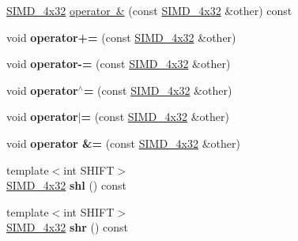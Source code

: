 \begin{DoxyCompactItemize}
\item 
\mbox{\hyperlink{class_botan_1_1_s_i_m_d__4x32}{S\+I\+M\+D\+\_\+4x32}} \mbox{\hyperlink{class_botan_1_1_s_i_m_d__4x32_ac6a07777190e0fdb9fb9147e63d8e57a}{operator \&}} (const \mbox{\hyperlink{class_botan_1_1_s_i_m_d__4x32}{S\+I\+M\+D\+\_\+4x32}} \&other) const
\item 
\mbox{\label{class_botan_1_1_s_i_m_d__4x32_a18258301e5b545b1f1829e6f41fd2c85}} 
void {\bfseries operator+=} (const \mbox{\hyperlink{class_botan_1_1_s_i_m_d__4x32}{S\+I\+M\+D\+\_\+4x32}} \&other)
\item 
\mbox{\label{class_botan_1_1_s_i_m_d__4x32_a14d988ef463a57146ca69b76b26ea7a2}} 
void {\bfseries operator-\/=} (const \mbox{\hyperlink{class_botan_1_1_s_i_m_d__4x32}{S\+I\+M\+D\+\_\+4x32}} \&other)
\item 
\mbox{\label{class_botan_1_1_s_i_m_d__4x32_af2530b46ff199ece1058295a9bb78b74}} 
void {\bfseries operator$^\wedge$=} (const \mbox{\hyperlink{class_botan_1_1_s_i_m_d__4x32}{S\+I\+M\+D\+\_\+4x32}} \&other)
\item 
\mbox{\label{class_botan_1_1_s_i_m_d__4x32_ad13749bb003d926682dd6a242e9f8689}} 
void {\bfseries operator$\vert$=} (const \mbox{\hyperlink{class_botan_1_1_s_i_m_d__4x32}{S\+I\+M\+D\+\_\+4x32}} \&other)
\item 
\mbox{\label{class_botan_1_1_s_i_m_d__4x32_a897f97dfd3dea303e8f429988f17f6ee}} 
void {\bfseries operator \&=} (const \mbox{\hyperlink{class_botan_1_1_s_i_m_d__4x32}{S\+I\+M\+D\+\_\+4x32}} \&other)
\item 
\mbox{\label{class_botan_1_1_s_i_m_d__4x32_ad6caa7927e7d584eb78d7fe3cd3ba03b}} 
{\footnotesize template$<$int S\+H\+I\+FT$>$ }\\\mbox{\hyperlink{class_botan_1_1_s_i_m_d__4x32}{S\+I\+M\+D\+\_\+4x32}} {\bfseries shl} () const
\item 
\mbox{\label{class_botan_1_1_s_i_m_d__4x32_a1bd28e9e525fb27a391d3a164d9c2e5d}} 
{\footnotesize template$<$int S\+H\+I\+FT$>$ }\\\mbox{\hyperlink{class_botan_1_1_s_i_m_d__4x32}{S\+I\+M\+D\+\_\+4x32}} {\bfseries shr} () const

\end{DoxyCompactItemize}
